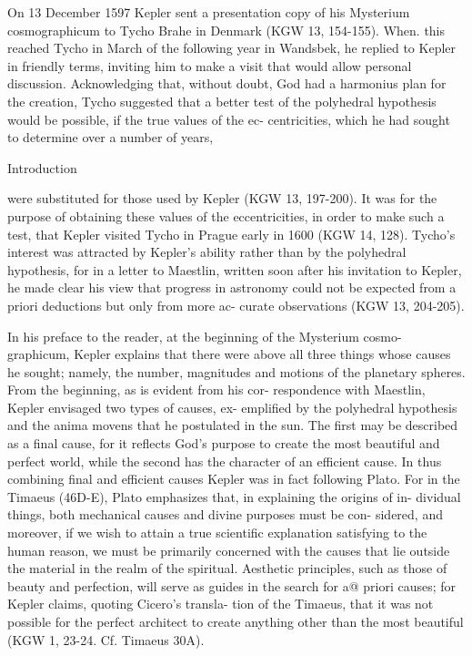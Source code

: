 \documentclass{article}
\begin{document}
On 13 December 1597 Kepler sent a presentation copy of his Mysterium
cosmographicum to Tycho Brahe in Denmark (KGW 13, 154-155). When.
this reached Tycho in March of the following year in Wandsbek, he
replied to Kepler in friendly terms, inviting him to make a visit that would
allow personal discussion. Acknowledging that, without doubt, God had
a harmonius plan for the creation, Tycho suggested that a better test of
the polyhedral hypothesis would be possible, if the true values of the ec-
centricities, which he had sought to determine over a number of years,


Introduction

were substituted for those used by Kepler (KGW 13, 197-200). It was for
the purpose of obtaining these values of the eccentricities, in order to
make such a test, that Kepler visited Tycho in Prague early in 1600 (KGW
14, 128). Tycho’s interest was attracted by Kepler’s ability rather than by
the polyhedral hypothesis, for in a letter to Maestlin, written soon after
his invitation to Kepler, he made clear his view that progress in astronomy
could not be expected from a priori deductions but only from more ac-
curate observations (KGW 13, 204-205).

In his preface to the reader, at the beginning of the Mysterium cosmo-
graphicum, Kepler explains that there were above all three things whose
causes he sought; namely, the number, magnitudes and motions of the
planetary spheres. From the beginning, as is evident from his cor-
respondence with Maestlin, Kepler envisaged two types of causes, ex-
emplified by the polyhedral hypothesis and the anima movens that he
postulated in the sun. The first may be described as a final cause, for it
reflects God’s purpose to create the most beautiful and perfect world,
while the second has the character of an efficient cause. In thus combining
final and efficient causes Kepler was in fact following Plato. For in the
Timaeus (46D-E), Plato emphasizes that, in explaining the origins of in-
dividual things, both mechanical causes and divine purposes must be con-
sidered, and moreover, if we wish to attain a true scientific explanation
satisfying to the human reason, we must be primarily concerned with the
causes that lie outside the material in the realm of the spiritual. Aesthetic
principles, such as those of beauty and perfection, will serve as guides in
the search for a@ priori causes; for Kepler claims, quoting Cicero’s transla-
tion of the Timaeus, that it was not possible for the perfect architect to
create anything other than the most beautiful (KGW 1, 23-24. Cf.
Timaeus 30A).
\end{document}
